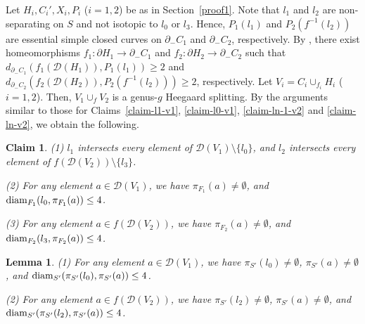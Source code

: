 \documentclass[]{aspm}
\newtheorem{lemma}[definition]{Lemma}
\newtheorem{claim}[definition]{Claim}
\begin{document}
Let $H_i, C_i', X_i, P_i$ ($i=1,2$) be as in Section~\ref{proof1}.
Note that $l_1$ and $l_2$ are non-separating on $S$ and not isotopic to $l_{0}$ or $l_{3}$. 
Hence, $P_1(l_1)$ and $P_2(f^{-1}(l_2))$ are essential simple closed curves on $\partial_- C_1$ and $\partial_- C_2$, respectively.
By \cite{AS}, there exist homeomorphisms $f_1:\partial H_1\rightarrow \partial_- C_1$ and $f_2:\partial H_2\rightarrow \partial_- C_2$ such that 
$d_{\partial_- C_1} (f_1(\mathcal{D}(H_1)), P_1(l_1))\geq 2$ and $d_{\partial_- C_2} (f_2(\mathcal{D}(H_2)), P_2(f^{-1}(l_2)))\geq 2$, respectively.
Let $V_i=C_i\cup_{f_i} H_i$ ($i=1,2$).
Then, $V_1\cup_f V_2$ is a genus-$g$ Heegaard splitting.
By the arguments similar to those for Claims~\ref{claim-l1-v1}, \ref{claim-l0-v1}, \ref{claim-ln-1-v2} and \ref{claim-ln-v2}, we obtain the following. 

\begin{claim}\label{claim-n3-1}
{\rm (1)} $l_1$ intersects every element of $\mathcal{D}(V_1)\setminus \{l_0\}$, and $l_2$ intersects every element of $f(\mathcal{D}(V_2))\setminus \{l_3\}$.

{\rm (2)} For any element $a\in\mathcal{D}(V_1)$, we have $\pi_{F_1}(a)\neq \emptyset$, and ${\rm diam}_{F_1}(l_0, \pi_{F_1}(a))\leq 4$.

{\rm (3)} For any element $a\in f(\mathcal{D}(V_2))$, we have $\pi_{F_2}(a)\neq \emptyset$, and ${\rm diam}_{F_2}(l_3, \pi_{F_2}(a))\leq 4$.
\end{claim}


\begin{lemma}\label{claim-n3-2}
{\rm (1)} For any element $a\in\mathcal{D}(V_1)$, we have $\pi_{S'}(l_0)\neq \emptyset$, $\pi_{S'}(a)\neq \emptyset$, and ${\rm diam}_{S'}(\pi_{S'}(l_0), \pi_{S'}(a))\leq 4$.

{\rm (2)} For any element $a\in f(\mathcal{D}(V_2))$, we have $\pi_{S'}(l_2)\neq \emptyset$, $\pi_{S'}(a)\neq \emptyset$, and ${\rm diam}_{S'}(\pi_{S'}(l_2), \pi_{S'}(a))\leq 4$.
\end{lemma}
\end{document}
